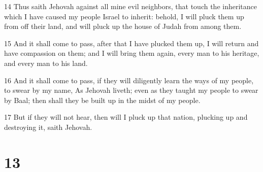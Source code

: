 \par 14 Thus saith Jehovah against all mine evil neighbors, that touch the inheritance which I have caused my people Israel to inherit: behold, I will pluck them up from off their land, and will pluck up the house of Judah from among them.
\par 15 And it shall come to pass, after that I have plucked them up, I will return and have compassion on them; and I will bring them again, every man to his heritage, and every man to his land.
\par 16 And it shall come to pass, if they will diligently learn the ways of my people, to swear by my name, As Jehovah liveth; even as they taught my people to swear by Baal; then shall they be built up in the midst of my people.
\par 17 But if they will not hear, then will I pluck up that nation, plucking up and destroying it, saith Jehovah.

\chapter{13}


